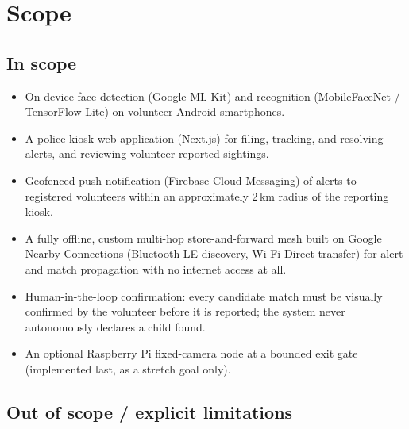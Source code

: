 \documentclass[12pt,a4paper,oneside]{report}
\begin{document}
\section{Scope}

\subsection*{In scope}

\begin{itemize}
  \item On-device face detection (Google ML Kit) and recognition
        (MobileFaceNet / TensorFlow Lite) on volunteer Android smartphones.
  \item A police kiosk web application (Next.js) for filing, tracking, and
        resolving alerts, and reviewing volunteer-reported sightings.
  \item Geofenced push notification (Firebase Cloud Messaging) of alerts to
        registered volunteers within an approximately 2\,km radius of the
        reporting kiosk.
  \item A fully offline, custom multi-hop store-and-forward mesh built on
        Google Nearby Connections (Bluetooth LE discovery, Wi-Fi Direct
        transfer) for alert and match propagation with no internet access
        at all.
  \item Human-in-the-loop confirmation: every candidate match must be
        visually confirmed by the volunteer before it is reported; the
        system never autonomously declares a child found.
  \item An optional Raspberry Pi fixed-camera node at a bounded exit gate
        (implemented last, as a stretch goal only).
\end{itemize}

\subsection*{Out of scope / explicit limitations}
\end{document}
